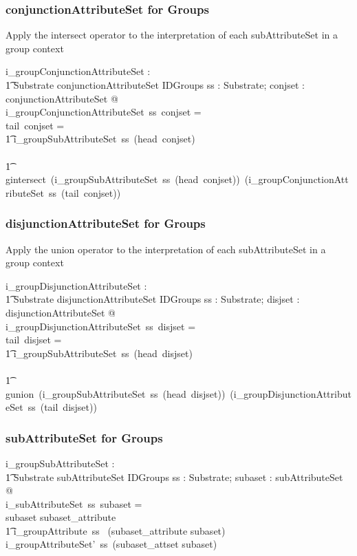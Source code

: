 \documentclass{article}
\begin{document}
\subsubsection{conjunctionAttributeSet for Groups}
Apply the intersect operator to the interpretation of each  subAttributeSet in a group context

\begin{gendef}
    i\_groupConjunctionAttributeSet : \\
\t1 Substrate \fun conjunctionAttributeSet \fun IDGroups
\where
   \forall ss : Substrate;  conjset : conjunctionAttributeSet @ \\
   i\_groupConjunctionAttributeSet~ss~conjset = ~ \\
   \IF tail~conjset = \langle \rangle \\
\t1 \THEN i\_groupSubAttributeSet~ss~(head~conjset) \\
\ELSE \\
\t1 gintersect~(i\_groupSubAttributeSet~ss~(head~conjset))~(i\_groupConjunctionAttributeSet~ss~(tail~conjset))
\end{gendef}


\subsubsection{disjunctionAttributeSet for Groups}
Apply the union operator to the interpretation of each  subAttributeSet in a group context

\begin{gendef}
    i\_groupDisjunctionAttributeSet : \\
\t1 Substrate \fun disjunctionAttributeSet \fun IDGroups
\where
   \forall ss : Substrate;  disjset : disjunctionAttributeSet @ \\
   i\_groupDisjunctionAttributeSet~ss~disjset = ~ \\
   \IF tail~disjset = \langle \rangle \\
\t1 \THEN i\_groupSubAttributeSet~ss~(head~disjset) \\
\ELSE \\
\t1 gunion~(i\_groupSubAttributeSet~ss~(head~disjset))~(i\_groupDisjunctionAttributeSet~ss~(tail~disjset))
\end{gendef}

\subsubsection{subAttributeSet for Groups}

\begin{gendef}
   i\_groupSubAttributeSet : \\
\t1 Substrate \fun subAttributeSet \fun IDGroups
\where
  \forall ss : Substrate; subaset : subAttributeSet @ \\
  i\_subAttributeSet~ss~subaset = \\
  \IF subaset \in \ran subaset\_attribute \THEN \\
 \t1 i\_groupAttribute~ss~ (subaset\_attribute \inv subaset) \\
 \ELSE i\_groupAttributeSet'~ss~(subaset\_attset \inv subaset)
\end{gendef}
\end{document}
